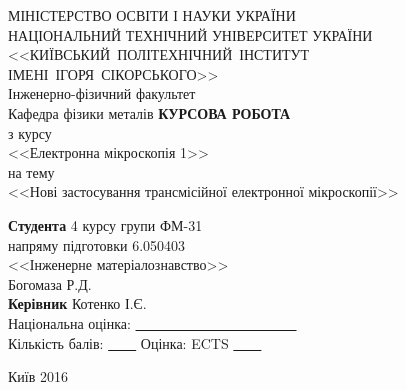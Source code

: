 \begin{titlepage}
  \begin{center}
    \textsc{МІНІСТЕРСТВО ОСВІТИ І НАУКИ УКРАЇНИ \\
      НАЦІОНАЛЬНИЙ ТЕХНІЧНИЙ УНІВЕРСИТЕТ УКРАЇНИ \\}
      <<КИЇВСЬКИЙ~ПОЛІТЕХНІЧНИЙ~ІНСТИТУТ ІМЕНІ~ІГОРЯ~СІКОРСЬКОГО>>\\
      Інженерно-фізичний факультет\\
      Кафедра фізики металів
    \vfill
    \textbf{КУРСОВА РОБОТА\\[3mm]}
      з курсу\\
      <<Електронна мікроскопія 1>>\\[3mm]
      на тему \\
<<Нові застосування трансмісійної електронної мікроскопії>>
      \\[20mm]
  \end{center}
  \hfill
  \begin{minipage}{.5\textwidth}
    {\bf Студента} 4 курсу групи ФМ-31 \\%
    напряму підготовки 6.050403\\
    <<Інженерне матеріалознавство>> \\
    Богомаза Р.Д.\\[3mm]

    {\bf Керівник} Котенко І.Є.\\[2mm]
    Національна оцінка: \underline{~~~~~~~~~~~~~~~~~~~~~~~} \\
    Кількість балів: \underline{~~~~} Оцінка: ECTS \underline{~~~~}
  \end{minipage}
  \vfill
  \begin{center}
    Київ 2016
  \end{center}
\end{titlepage}
